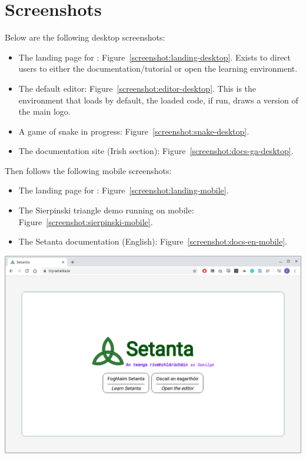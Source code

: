 \chapter{\trys{} Screenshots}
\label{appendix:screenshots}

Below are the following desktop screenshots:
\begin{itemize}
    \item The landing page for \trys{}: Figure~\ref{screenshot:landing-desktop}. Exists to direct users to either the documentation/tutorial or open the learning environment.
    \item The default editor: Figure~\ref{screenshot:editor-desktop}. This is the environment that loads by default, the loaded code, if run, draws a version of the main logo.
    \item A game of snake in progress: Figure~\ref{screenshot:snake-desktop}.
    \item The documentation site (Irish section): Figure~\ref{screenshot:docs-ga-desktop}.
\end{itemize}
Then follows the following mobile screenshots:
\begin{itemize}
    \item The landing page for \trys{}: Figure~\ref{screenshot:landing-mobile}.
    \item The Sierpinski triangle demo running on mobile: Figure~\ref{screenshot:sierpinski-mobile}.
    \item The Setanta documentation (English): Figure~\ref{screenshot:docs-en-mobile}.
\end{itemize}

\begin{center}
    \includegraphics[scale=0.38]{app4assets/landing-desktop}
    \label{screenshot:landing-desktop}
\end{center}

